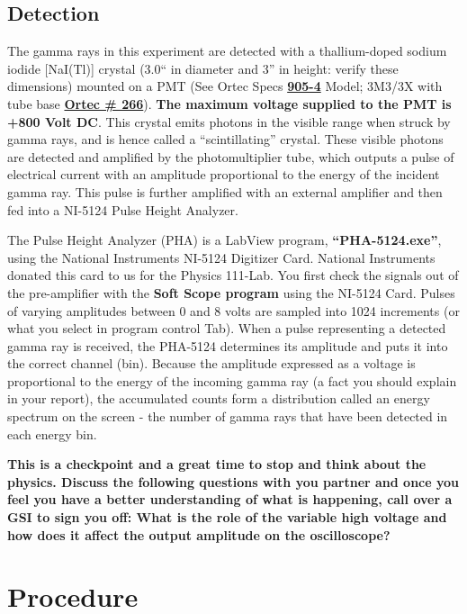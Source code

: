 \documentclass{../lab}
\begin{document}
\subsection{Detection}

The gamma rays in this experiment are detected with a thallium-doped sodium iodide [NaI(Tl)] crystal (3.0`` in diameter and 3'' in height: verify these dimensions) mounted on a PMT (See Ortec Specs \href{http://experimentationlab.berkeley.edu/sites/default/files/images/905-4.pdf}{\textbf{905-4}} Model; 3M3/3X with tube base \href{http://experimentationlab.berkeley.edu/sites/default/files/images/266.pdf}{\textbf{Ortec \# 266}}). \textbf{The maximum voltage supplied to the PMT is +800 Volt DC}. This crystal emits photons in the visible range when struck by gamma rays, and is hence called a ``scintillating'' crystal. These visible photons are detected and amplified by the photomultiplier tube, which outputs a pulse of electrical current with an amplitude proportional to the energy of the incident gamma ray. This pulse is further amplified with an external amplifier and then fed into a NI-5124 Pulse Height Analyzer.

The Pulse Height Analyzer (PHA) is a LabView program, \textbf{``PHA-5124.exe''}, using the National Instruments NI-5124 Digitizer Card. National Instruments donated this card to us for the Physics 111-Lab. You first check the signals out of the pre-amplifier with the \textbf{Soft Scope program} using the NI-5124 Card. Pulses of varying amplitudes between 0 and 8 volts are sampled into 1024 increments (or what you select in program control Tab). When a pulse representing a detected gamma ray is received, the PHA-5124 determines its amplitude and puts it into the correct channel (bin). Because the amplitude expressed as a voltage is proportional to the energy of the incoming gamma ray (a fact you should explain in your report), the accumulated counts form a distribution called an energy spectrum on the screen - the number of gamma rays that have been detected in each energy bin.

\textbf{This is a checkpoint and a great time to stop and think about the physics. Discuss the following questions with you partner and once you feel you have a better understanding of what is happening, call over a GSI to sign you off: What is the role of the variable high voltage and how does it affect the output amplitude on the oscilloscope?}

\section{Procedure}
\end{document}

